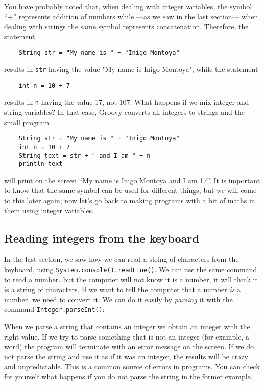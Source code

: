You have probably noted that, when dealing with integer
variables, the symbol ``+'' represents addition of numbers while ---as
we saw in the last section--- when dealing with strings the same
symbol represents concatenation. Therefore, the statement

\begin{Verbatim}
    String str = "My name is " + "Inigo Montoya"
\end{Verbatim}

results in \verb+str+ having the value "My name is Inigo Montoya",
while the statement

\begin{Verbatim}
    int n = 10 + 7
\end{Verbatim}

results in \verb+n+ having the value 17, not 107. What happens if we
mix integer and string variables? In that case, Groovy converts all
integers to strings and the small program

\begin{Verbatim}
    String str = "My name is " + "Inigo Montoya"
    int n = 10 + 7
    String text = str + " and I am " + n
    println text
\end{Verbatim}

will print on the screen ``My name is Inigo Montoya and I am 17''. It
is important to know that the same symbol can be used for different
things, but we will come to this later again; now let's go back to
making programs with a bit of maths in them using integer variables.

\subsection{Reading integers from the keyboard}
\label{sec:intkeyboard}

In the last section, we saw how we can read a string of characters
from the keyboard, 
using \verb+System.console().readLine()+. We can use the same command
to read a number\ldots but the computer will not know it is a number,
it will think it is a string of characters. If we want to tell the
computer that a number \emph{is} a number, we need to convert it. We
can do it easily by \emph{parsing} it with the command
\verb+Integer.parseInt()+: 


When we parse a string that contains an integer we obtain an integer
with the right value. If we try to parse something that is not an
integer (for example, a word) the program will terminate with an error
message on the screen. If we do not parse the string and use it as if
it was an integer, the results will be crazy and unpredictable. This
is a common source of errors in programs. You can check for yourself
what happens if you do not parse the string in the former example. 

